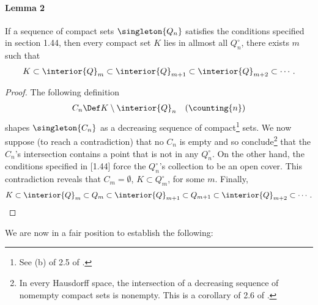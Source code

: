 \paragraph{Lemma 2} \label{1.16 Lemma 2}
If a sequence of compact sets $\singleton{Q_n}$ satisfies the conditions 
specified in section 1.44, then every compact set $K$ lies in allmost all 
%
  $Q^\circ_n$, \ie
%
there exists $m$ such that 
%
  \begin{align}
    K \subset 
    \interior{Q}_m 
      \subset 
    \interior{Q}_{m+1}
      \subset
    \interior{Q}_{m+2}
      \subset
    \cdots.
  \end{align}
%
\begin{proof}
The following definition
%
  \begin{align}
    C_n \Def K \setminus \interior{Q}_n \quad (\counting{n})
  \end{align}
%
shapes $\singleton{C_n}$ as a decreasing sequence of compact\footnote{
  See (b) of 2.5 of \cite{BigRudin}.
} 
sets. We now suppose (to reach a contradiction) that 
% 
  no $C_n$ is empty 
% 
and so conclude\footnote{
  In every Hausdorff space, the intersection of a decreasing sequence of %
  nomempty compact sets is nonempty. %
  This is a corollary of 2.6 of \cite{BigRudin}.
} 
that the $C_n$'s intersection contains a point that is not in any $Q^\circ_n$. 
On the other hand, the conditions specified in [1.44] force the 
% 
  $Q^\circ_n$'s collection  
%
to be an open cover.
% 
This contradiction reveals that 
%
  $C_m = \emptyset$, 
    \ie 
  $K \subset Q^\circ_m$, 
%  
for some $m$.
%
Finally,  
%
  \begin{align}
    K\subset 
    \interior{Q}_m
      \subset
    Q_m
      \subset
    \interior{Q}_{m+1}
      \subset
    Q_{m +1}
      \subset
    \interior{Q}_{m+2}
      \subset
    \cdots.
  \end{align}  
%
\end{proof}
\noindent We are now in a fair position to establish the following:
